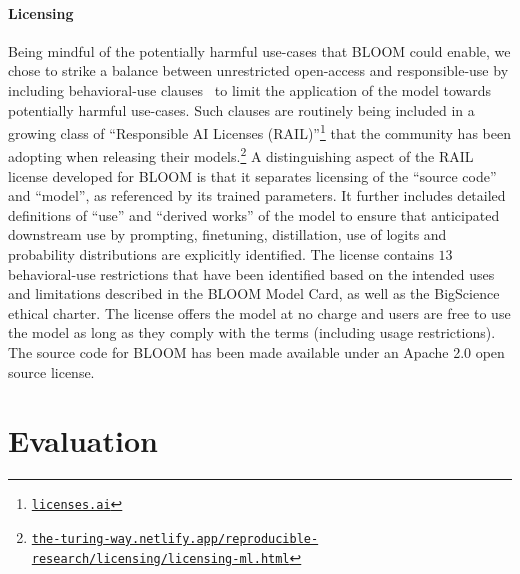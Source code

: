 \documentclass[twoside,11pt]{article}
\begin{document}
\paragraph{Licensing}
Being mindful of the potentially harmful use-cases that BLOOM could enable, we chose to strike a balance between unrestricted open-access and responsible-use by including behavioral-use clauses~\citep{LicensingPaper} to limit the application of the model towards potentially harmful use-cases. Such clauses are routinely being included in a growing class of ``Responsible AI Licenses (RAIL)''\footnote{\href{http://licenses.ai}{\texttt{licenses.ai}}} that the community has been adopting when releasing their models.\footnote{\href{https://the-turing-way.netlify.app/reproducible-research/licensing/licensing-ml.html}{\texttt{the-turing-way.netlify.app/reproducible-research/licensing/licensing-ml.html}}} 
%
A distinguishing aspect of the RAIL license developed for BLOOM is that it separates licensing of the ``source code'' and ``model'', as referenced by its trained parameters. It further includes detailed definitions of ``use'' and ``derived works'' of the model to ensure that anticipated downstream use by prompting, finetuning, distillation, use of logits and probability distributions are explicitly identified. The license contains $13$ behavioral-use restrictions that have been identified based on the intended uses and limitations described in the BLOOM Model Card, as well as the BigScience ethical charter. The license offers the model at no charge and users are free to use the model as long as they comply with the terms (including usage restrictions). The source code for BLOOM has been made available under an Apache 2.0 open source license.

\section{Evaluation}
\label{sec:evaluation}
\end{document}
